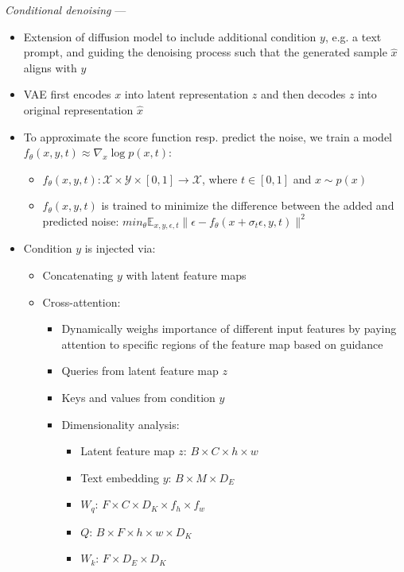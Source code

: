 \emph{Conditional denoising} --- 
\begin{itemize}
    \item Extension of diffusion model to include additional condition $y$, e.g. a text prompt, and guiding the denoising process such that the generated sample $\hat{x}$ aligns with $y$
    \item VAE first encodes $x$ into latent representation $z$ and then decodes $z$ into original representation $\hat{x}$
    \item To approximate the score function resp. predict the noise, we train a model $f_\theta(x,y,t) \approx \nabla_x \log p(x,t)$:
    \begin{itemize}
        \item $f_\theta(x,y,t): \mathcal{X} \times \mathcal{Y} \times [0,1] \rightarrow \mathcal{X}$, where $t \in [0,1]$ and $x \sim p(x)$
        \item $f_\theta(x,y,t)$ is trained to minimize the difference between the added and predicted noise: $min_\theta \mathbb{E}_{x,y,\epsilon,t} \| \epsilon - f_\theta(x + \sigma_t \epsilon, y, t) \|^2$
    \end{itemize}
    \item Condition $y$ is injected via:
    \begin{itemize}
        \item Concatenating $y$ with latent feature maps
        \item Cross-attention:
        \begin{itemize}
            \item Dynamically weighs importance of different input features by paying attention to specific regions of the feature map based on guidance
            \item Queries from latent feature map $z$
            \item Keys and values from condition $y$
            \item Dimensionality analysis:
            \begin{itemize}
                \item Latent feature map $z$: $B \times C \times h \times w$
                \item Text embedding $y$: $B \times M \times D_E$
                \item $W_q$: $F \times C \times D_K \times f_h \times f_w$
                \item $Q$: $B \times F \times h \times w \times D_K$
                \item $W_k$: $F \times D_E \times D_K$

\end{itemize}
\end{itemize}
\end{itemize}
\end{itemize}
